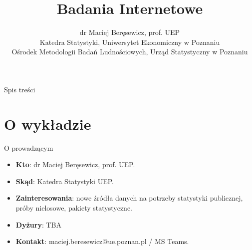 \documentclass[10pt,ignorenonframetext, aspectratio=169]{beamer}
\author[Badania Internetowe 2023 (Beręsewicz)]{dr Maciej Beręsewicz, prof. UEP 
    \\ \small{Katedra Statystyki, Uniwersytet Ekonomiczny w Poznaniu}  
    \\ \small{Ośrodek Metodologii Badań Ludnościowych, Urząd Statystyczny w Poznaniu}
    }
\title{Badania Internetowe}
\date{}
\begin{document}
\begin{frame}[plain]{}
\titlepage
\end{frame}

\begin{frame}[plain]{Spis treści}
\tableofcontents
\end{frame}


\section{O wykładzie}
    
    
    


    
    
    


\begin{frame}{O prowadzącym}
    \begin{itemize}
        \item \textbf{Kto}: dr Maciej Beręsewicz, prof. UEP.
        \item \textbf{Skąd}: Katedra Statystyki UEP.
        \item \textbf{Zainteresowania}: nowe źródła danych na potrzeby statystyki publicznej, próby nielosowe, pakiety statystyczne.
        \item \textbf{Dyżury}: TBA
        \item \textbf{Kontakt}: maciej.beresewicz@ue.poznan.pl / MS Teams.
    \end{itemize}
\end{frame}
\end{document}
